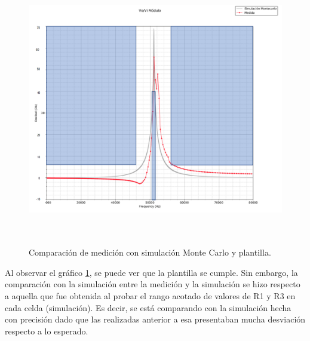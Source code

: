 \begin{figure}[H] %
	\centering	\includegraphics[width=12cm,height=12cm,keepaspectratio]{../EJ4/graficos/PLANTILLA_BIEN.png}
	\caption{Comparaci\'on de medici\'on con simulaci\'on Monte Carlo y plantilla.}
	\label{plantilla}
\end{figure}

Al observar el gr\'afico \ref{plantilla}, se puede ver que la plantilla se cumple. Sin embargo, la comparaci\'on con la simulaci\'on entre la medici\'on y la simulaci\'on se hizo respecto a aquella que fue obtenida al probar el rango acotado de valores de R1 y R3 en cada celda (simulaci\'on). Es decir, se est\'a comparando con la simulaci\'on hecha con precisi\'on dado que las realizadas anterior a esa presentaban mucha desviaci\'on respecto a lo esperado.


